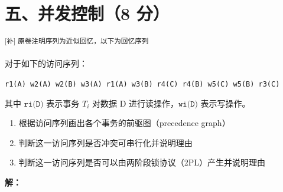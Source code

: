 \documentclass[11pt,a4paper]{article}
\newcommand{\solution}{\par\noindent\textcolor{ansblue}{\textbf{解：}}}
\newcommand{\supp}[1]{\textcolor{ansred}{\textsuperscript{[补] #1}}}
\begin{document}
\newpage
\section*{五、并发控制（8 分）}

\supp{原卷注明序列为近似回忆，以下为回忆序列}

对于如下的访问序列：
\begin{center}
\texttt{r1(A) w2(A) w2(B) w3(A) r1(A) w3(B) r4(C) r4(B) w5(C) w5(B) r3(C)}
\end{center}

其中 $\texttt{ri(D)}$ 表示事务 $T_i$ 对数据 D 进行读操作，$\texttt{wi(D)}$ 表示写操作。

\begin{enumerate}[label=(\arabic*),leftmargin=*]
  \item 根据访问序列画出各个事务的前驱图（precedence graph）
  \item 判断这一访问序列是否冲突可串行化并说明理由
  \item 判断这一访问序列是否可以由两阶段锁协议（2PL）产生并说明理由
\end{enumerate}

\solution
\end{document}
